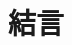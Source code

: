\documentclass[11pt, a4j, dvipdfmx]{jarticle}
\begin{document}
\section{\large 結言}
\par
\end{document}
